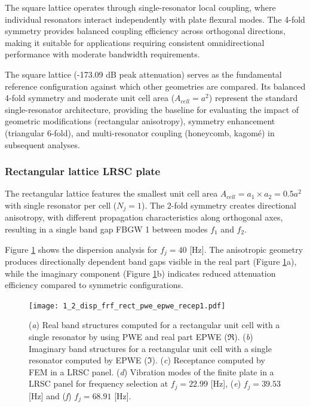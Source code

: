 \documentclass[review,numbers,sort&compress]{elsarticle}
\begin{document}
{The square lattice operates through single-resonator local coupling, where individual resonators interact independently with plate flexural modes. The 4-fold symmetry provides balanced coupling efficiency across orthogonal directions, making it suitable for applications requiring consistent omnidirectional performance with moderate bandwidth requirements.

The square lattice (-173.09 dB peak attenuation) serves as the fundamental reference configuration against which other geometries are compared. Its balanced 4-fold symmetry and moderate unit cell area ($A_{cell} = a^2$) represent the standard single-resonator architecture, providing the baseline for evaluating the impact of geometric modifications (rectangular anisotropy), symmetry enhancement (triangular 6-fold), and multi-resonator coupling (honeycomb, kagomé) in subsequent analyses.

\subsubsection{Rectangular lattice LRSC plate}\label{panel_lat_r}

The rectangular lattice features the smallest unit cell area $A_{cell} = a_1 \times a_2 = 0.5a^2$ with single resonator per cell ($N_j = 1$). The 2-fold symmetry creates directional anisotropy, with different propagation characteristics along orthogonal axes, resulting in a single band gap FBGW 1 between modes $f_1$ and $f_2$.

Figure \ref{lat_r_pwe_epwe_tr_frf} shows the dispersion analysis for $f_j = 40$ [Hz]. The anisotropic geometry produces directionally dependent band gaps visible in the real part (Figure \ref{lat_r_pwe_epwe_tr_frf}a), while the imaginary component (Figure \ref{lat_r_pwe_epwe_tr_frf}b) indicates reduced attenuation efficiency compared to symmetric configurations.

\begin{figure}[htb]
	\centering
	\texttt{[image: 1\_2\_disp\_frf\_rect\_pwe\_epwe\_recep1.pdf]}
	\caption{(\textit{a}) Real band structures computed for a rectangular unit cell with a single resonator by using PWE and real part EPWE ($\Re$). (\textit{b}) Imaginary band structures for a rectangular unit cell with a single resonator computed by EPWE ($\Im$). (\textit{c}) Receptance computed by FEM in a LRSC panel. (\textit{d}) Vibration modes of the finite plate in a LRSC panel for frequency selection at $f_j = 22.99$ [Hz], (\textit{e}) $f_j = 39.53$ [Hz] and (\textit{f}) $f_j = 68.91$ [Hz].}
	\label{lat_r_pwe_epwe_tr_frf}
\end{figure}

}
\end{document}
